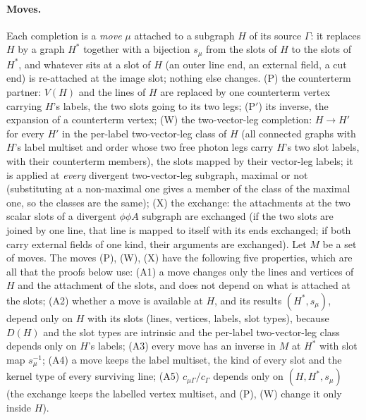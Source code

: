 \paragraph{Moves.} Each completion is a \emph{move} $\mu$ attached to a subgraph $H$ of its source $\Gamma$: it replaces $H$ by a graph $H^*$ together with a bijection $s_\mu$ from the slots of $H$ to the slots of $H^*$, and whatever sits at a slot of $H$ (an outer line end, an external field, a cut end) is re-attached at the image slot; nothing else changes. (P) the counterterm partner: $V(H)$ and the lines of $H$ are replaced by one counterterm vertex carrying $H$'s labels, the two slots going to its two legs; (P$'$) its inverse, the expansion of a counterterm vertex; (W) the two-vector-leg completion: $H\to H'$ for every $H'$ in the per-label two-vector-leg class of $H$ (all connected graphs with $H$'s label multiset and order whose two free photon legs carry $H$'s two slot labels, with their counterterm members), the slots mapped by their vector-leg labels; it is applied at \emph{every} divergent two-vector-leg subgraph, maximal or not (substituting at a non-maximal one gives a member of the class of the maximal one, so the classes are the same); (X) the exchange: the attachments at the two scalar slots of a divergent $\phi\phi A$ subgraph are exchanged (if the two slots are joined by one line, that line is mapped to itself with its ends exchanged; if both carry external fields of one kind, their arguments are exchanged). Let $M$ be a set of moves. The moves (P), (W), (X) have the following five properties, which are all that the proofs below use: \textup{(A1)} a move changes only the lines and vertices of $H$ and the attachment of the slots, and does not depend on what is attached at the slots; \textup{(A2)} whether a move is available at $H$, and its results $(H^*,s_\mu)$, depend only on $H$ with its slots (lines, vertices, labels, slot types), because $D(H)$ and the slot types are intrinsic and the per-label two-vector-leg class depends only on $H$'s labels; \textup{(A3)} every move has an inverse in $M$ at $H^*$ with slot map $s_\mu^{-1}$; \textup{(A4)} a move keeps the label multiset, the kind of every slot and the kernel type of every surviving line; \textup{(A5)} $c_{\mu\Gamma}/c_\Gamma$ depends only on $(H,H^*,s_\mu)$ (the exchange keeps the labelled vertex multiset, and (P), (W) change it only inside $H$).

